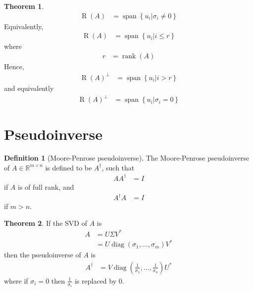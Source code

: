 \documentclass[titlepage, fleqn, a4paper, 12pt, twoside]{article}
\theoremstyle{definition}
\newtheorem{definition}{Definition}
\theoremstyle{theorem}
\newtheorem{theorem}{Theorem}
\DeclareMathOperator{\vspan}{\mathrm{span}}
\DeclareMathOperator{\range}{\mathrm{R}}
\DeclareMathOperator{\rank}{\mathrm{rank}}
\DeclareMathOperator{\diag}{\mathrm{diag}}
\begin{document}
\begin{theorem}
	\begin{align*}
		\range(A) &= \vspan\left\{ u_i \Big| \sigma_i \neq 0 \right\}
	\end{align*}
	Equivalently,
	\begin{align*}
		\range(A) &= \vspan\left\{ u_i \Big| i \le r \right\}
	\end{align*}
	where
	\begin{align*}
		r &= \rank(A)
	\end{align*}
	Hence,
	\begin{align*}
		\range(A)^{\perp} &= \vspan\left\{ u_i \Big| i > r \right\}
	\end{align*}
	and equivalently
	\begin{align*}
		\range(A)^{\perp} &= \vspan\left\{ u_i \Big| \sigma_i = 0 \right\}
	\end{align*}
\end{theorem}

\section{Pseudoinverse}

\begin{definition}[Moore-Penrose pseudoinverse]
	The Moore-Penrose pseudoinverse of $A \in \mathbb{R}^{m \times n}$ is defined to be $A^{\dagger}$, such that
	\begin{align*}
		A A^{\dagger} &= I
	\end{align*}
	if $A$ is of full rank, and
	\begin{align*}
		A^{\dagger} A &= I
	\end{align*}
	if $m > n$.
\end{definition}

\begin{theorem}
	If the SVD of $A$ is
	\begin{align*}
		A &= U \Sigma V^*\\
		&= U \diag(\sigma_1,\dots,\sigma_m) V^*
	\end{align*}
	then the pseudoinverse of $A$ is
	\begin{align*}
		A^{\dagger} &= V \diag\left( \frac{1}{\sigma_1},\dots,\frac{1}{\sigma_n} \right) U^*
	\end{align*}
	where if $\sigma_i = 0$ then $\frac{1}{\sigma_i}$ is replaced by $0$.
\end{theorem}
\end{document}
